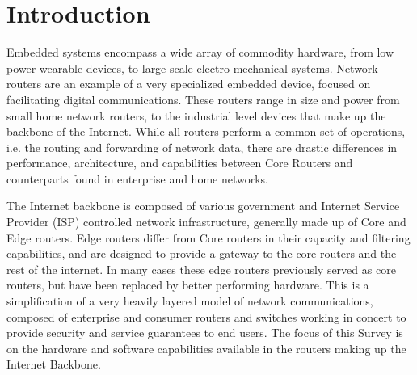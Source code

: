 \section{Introduction}
Embedded systems encompass a wide array of commodity hardware, from low power wearable devices, to large scale electro-mechanical systems. Network routers are an example of a very specialized embedded device, focused on facilitating digital communications. These routers range in size and power from small home network routers, to the industrial level devices that make up the backbone of the Internet. While all routers perform a common set of operations, i.e. the routing and forwarding of network data, there are drastic differences in performance, architecture, and capabilities between Core Routers and counterparts found in enterprise and home networks.

The Internet backbone is composed of various government and Internet Service Provider (ISP) controlled network infrastructure, generally made up of Core and Edge routers. Edge routers differ from Core routers in their capacity and filtering capabilities, and are designed to provide a gateway to the core routers and the rest of the internet. In many cases these edge routers previously served as core routers, but have been replaced by better performing hardware. This is a simplification of a very heavily layered model of network communications, composed of enterprise and consumer routers and switches working in concert to provide security and service guarantees to end users. The focus of this Survey is on the hardware and software capabilities available in the routers making up the Internet Backbone.

